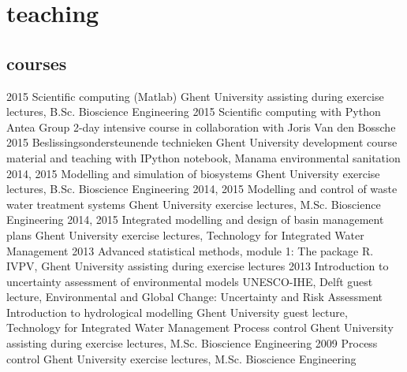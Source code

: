 \documentclass[]{stvhoey-cv}  %
\begin{document}
\section{teaching}
\subsection*{courses}
\begin{entrylist}
  \entry
    {2015}
    {Scientific computing (Matlab)}
    {Ghent University}
    {assisting during exercise lectures, B.Sc. Bioscience Engineering}
  \entry
    {2015}
    {Scientific computing with Python}
    {Antea Group}
    {2-day intensive course in collaboration with Joris Van den Bossche}
  \entry
    {2015}
    {Beslissingsondersteunende technieken}
    {Ghent University}
    {development course material and teaching with IPython notebook, Manama environmental sanitation}
  \entry
    {2014, 2015}
    {Modelling and simulation of biosystems}
    {Ghent University}
    {exercise lectures, B.Sc. Bioscience Engineering}
   \entry
    {2014, 2015} %
    {Modelling and control of waste water treatment systems}
    {Ghent University}
    {exercise lectures, M.Sc. Bioscience Engineering}
   \entry
    {2014, 2015}%
    {Integrated modelling and design of basin management plans}
    {Ghent University}
    {exercise lectures, Technology for Integrated Water Management}
   \entry
    {2013}
    {Advanced statistical methods, module 1: The package R.}
    {IVPV, Ghent University}
    {assisting during exercise lectures}
   \entry
    {2013}
    {Introduction to uncertainty assessment of environmental models}
    {UNESCO-IHE, Delft}
    {guest lecture, Environmental and Global Change: Uncertainty and Risk Assessment}
   \entry
    {}
    {Introduction to hydrological modelling}
    {Ghent University}
    {guest lecture, Technology for Integrated Water Management}
   \entry
	{} %
    {Process control}
    {Ghent University}
    {assisting during exercise lectures, M.Sc. Bioscience Engineering}
   \entry
    {2009}
    {Process control}
    {Ghent University}
    {exercise lectures, M.Sc. Bioscience Engineering}
\end{entrylist}
\end{document}
